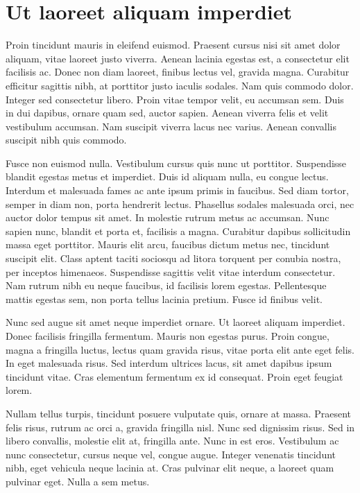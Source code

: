 \section{Ut laoreet aliquam imperdiet}
Proin tincidunt mauris in eleifend euismod. Praesent cursus nisi sit amet dolor aliquam, vitae laoreet justo viverra. Aenean lacinia egestas est, a consectetur elit facilisis ac. Donec non diam laoreet, finibus lectus vel, gravida magna. Curabitur efficitur sagittis nibh, at porttitor justo iaculis sodales. Nam quis commodo dolor. Integer sed consectetur libero. Proin vitae tempor velit, eu accumsan sem. Duis in dui dapibus, ornare quam sed, auctor sapien. Aenean viverra felis et velit vestibulum accumsan. Nam suscipit viverra lacus nec varius. Aenean convallis suscipit nibh quis commodo.

Fusce non euismod nulla. Vestibulum cursus quis nunc ut porttitor. Suspendisse blandit egestas metus et imperdiet. Duis id aliquam nulla, eu congue lectus. Interdum et malesuada fames ac ante ipsum primis in faucibus. Sed diam tortor, semper in diam non, porta hendrerit lectus. Phasellus sodales malesuada orci, nec auctor dolor tempus sit amet. In molestie rutrum metus ac accumsan. Nunc sapien nunc, blandit et porta et, facilisis a magna. Curabitur dapibus sollicitudin massa eget porttitor. Mauris elit arcu, faucibus dictum metus nec, tincidunt suscipit elit. Class aptent taciti sociosqu ad litora torquent per conubia nostra, per inceptos himenaeos. Suspendisse sagittis velit vitae interdum consectetur. Nam rutrum nibh eu neque faucibus, id facilisis lorem egestas. Pellentesque mattis egestas sem, non porta tellus lacinia pretium. Fusce id finibus velit.

Nunc sed augue sit amet neque imperdiet ornare. Ut laoreet aliquam imperdiet. Donec facilisis fringilla fermentum. Mauris non egestas purus. Proin congue, magna a fringilla luctus, lectus quam gravida risus, vitae porta elit ante eget felis. In eget malesuada risus. Sed interdum ultrices lacus, sit amet dapibus ipsum tincidunt vitae. Cras elementum fermentum ex id consequat. Proin eget feugiat lorem.

Nullam tellus turpis, tincidunt posuere vulputate quis, ornare at massa. Praesent felis risus, rutrum ac orci a, gravida fringilla nisl. Nunc sed dignissim risus. Sed in libero convallis, molestie elit at, fringilla ante. Nunc in est eros. Vestibulum ac nunc consectetur, cursus neque vel, congue augue. Integer venenatis tincidunt nibh, eget vehicula neque lacinia at. Cras pulvinar elit neque, a laoreet quam pulvinar eget. Nulla a sem metus.